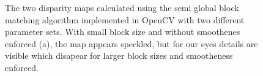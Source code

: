 \documentclass[11pt,a4paper]{article}
\begin{document}
\begin{figure}
\centering
{}




\caption{The two disparity maps calculated using the semi global block matching algorithm implemented in OpenCV with two different parameter sets. With small block size and without smoothenes enforced (a), the map appears speckled, but for our eyes details are visible which disapear for larger block sizes and smootheness enforced.}%
\label{fig:3}
\end{figure}
\end{document}
